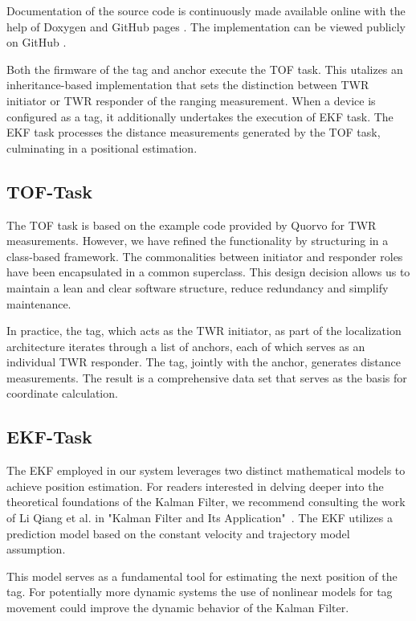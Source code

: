 \documentclass[final, conference, a4paper]{IEEEtran}
\begin{document}
Documentation of the source code is continuously made available online with the help of Doxygen and GitHub pages \cite{doxygen-doku}.
The implementation can be viewed publicly on GitHub \cite{uwb-tracking}.

Both the firmware of the tag and anchor execute the \ac{TOF} task.
This utalizes an inheritance-based implementation that sets the distinction between \ac{TWR} initiator or \ac{TWR} responder of the ranging measurement.
When a device is configured as a tag,
it additionally undertakes the execution of \ac{EKF} task.
The \ac{EKF} task processes the distance measurements generated by the \ac{TOF} task,
culminating in a positional estimation.

\subsection{TOF-Task}\label{section:firmware-tof}
The \ac{TOF} task is based on the example code
provided by Quorvo for \ac{TWR} measurements.
However, we have refined the functionality by structuring in a class-based framework.
The commonalities between initiator and responder roles have been
encapsulated in a common superclass.
This design decision allows us to maintain a lean and clear software structure,
reduce redundancy and simplify maintenance.

In practice, the tag, which acts as the \ac{TWR} initiator, as part of the localization architecture iterates through a list of anchors, each of which serves as an individual \ac{TWR} responder. 
The tag, jointly with the anchor, generates distance measurements. 
The result is a comprehensive data set that serves as the basis for coordinate calculation. 

\subsection{EKF-Task}\label{section:firmware-ekf}
The \ac{EKF} employed in our system leverages two distinct mathematical models
to achieve position estimation.
For readers interested in delving deeper into the theoretical foundations of the
Kalman Filter, we recommend consulting the work of Li Qiang et al. in
"Kalman Filter and Its Application"~\cite{Kalman}.
The \ac{EKF} utilizes a prediction model based on the constant velocity and trajectory model assumption.

This model serves as a fundamental tool for estimating the next position of the tag.
For potentially more dynamic systems the use of nonlinear models
for tag movement could improve the dynamic behavior of the Kalman Filter.
\end{document}
